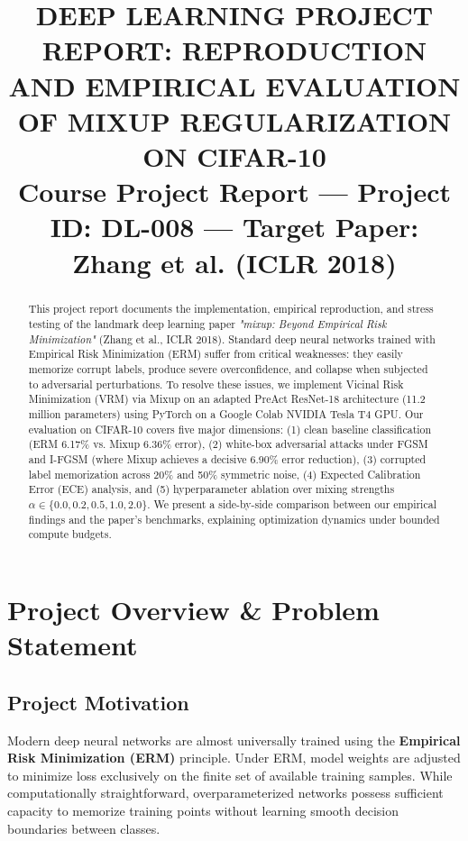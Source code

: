 \documentclass[conference]{IEEEtran}
\begin{document}
\title{DEEP LEARNING PROJECT REPORT: REPRODUCTION AND EMPIRICAL EVALUATION OF MIXUP REGULARIZATION ON CIFAR-10\\
{\footnotesize Course Project Report --- Project ID: DL-008 --- Target Paper: Zhang et al. (ICLR 2018)}
}

\author{
}

\maketitle

\begin{abstract}
This project report documents the implementation, empirical reproduction, and stress testing of the landmark deep learning paper \textit{"mixup: Beyond Empirical Risk Minimization"} (Zhang et al., ICLR 2018). Standard deep neural networks trained with Empirical Risk Minimization (ERM) suffer from critical weaknesses: they easily memorize corrupt labels, produce severe overconfidence, and collapse when subjected to adversarial perturbations. To resolve these issues, we implement Vicinal Risk Minimization (VRM) via Mixup on an adapted PreAct ResNet-18 architecture (11.2 million parameters) using PyTorch on a Google Colab NVIDIA Tesla T4 GPU. Our evaluation on CIFAR-10 covers five major dimensions: (1) clean baseline classification (ERM 6.17\% vs. Mixup 6.36\% error), (2) white-box adversarial attacks under FGSM and I-FGSM (where Mixup achieves a decisive 6.90\% error reduction), (3) corrupted label memorization across 20\% and 50\% symmetric noise, (4) Expected Calibration Error (ECE) analysis, and (5) hyperparameter ablation over mixing strengths $\alpha \in \{0.0, 0.2, 0.5, 1.0, 2.0\}$. We present a side-by-side comparison between our empirical findings and the paper's benchmarks, explaining optimization dynamics under bounded compute budgets.
\end{abstract}

\section{Project Overview \& Problem Statement}

\subsection{Project Motivation}
Modern deep neural networks are almost universally trained using the \textbf{Empirical Risk Minimization (ERM)} principle. Under ERM, model weights are adjusted to minimize loss exclusively on the finite set of available training samples. While computationally straightforward, overparameterized networks possess sufficient capacity to memorize training points without learning smooth decision boundaries between classes.
\end{document}
